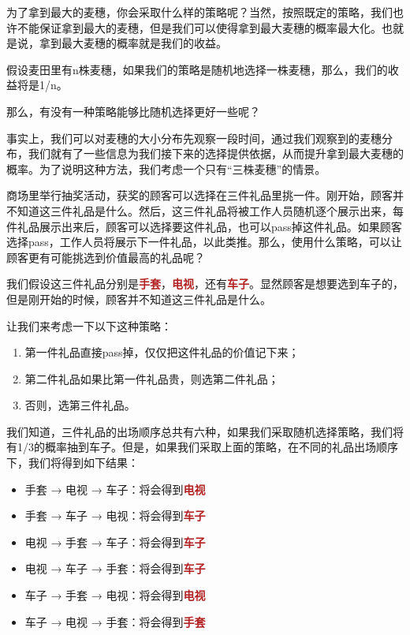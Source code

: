 \documentclass[12pt, letterpaper]{ctexrep}
\newenvironment{shadedquotation}
 {\begin{shaded*}
  \quoting[leftmargin=5pt, rightmargin=5pt, vskip=0pt]
 }
 {\endquoting
 \end{shaded*}
}
\begin{document}
为了拿到最大的麦穗，你会采取什么样的策略呢？当然，按照既定的策略，我们也许不能保证拿到最大的麦穗，但是我们可以使得拿到最大麦穗的概率最大化。也就是说，拿到最大麦穗的概率就是我们的收益。

假设麦田里有n株麦穗，如果我们的策略是随机地选择一株麦穗，那么，我们的收益将是1/n。

那么，有没有一种策略能够比随机选择更好一些呢？

事实上，我们可以对麦穗的大小分布先观察一段时间，通过我们观察到的麦穗分布，我们就有了一些信息为我们接下来的选择提供依据，从而提升拿到最大麦穗的概率。为了说明这种方法，我们考虑一个只有“三株麦穗”的情景。

\begin{shadedquotation}
\noindent
商场里举行抽奖活动，获奖的顾客可以选择在三件礼品里挑一件。刚开始，顾客并不知道这三件礼品是什么。然后，这三件礼品将被工作人员随机逐个展示出来，每件礼品展示出来后，顾客可以选择要这件礼品，也可以pass掉这件礼品。如果顾客选择pass，工作人员将展示下一件礼品，以此类推。那么，使用什么策略，可以让顾客更有可能挑选到价值最高的礼品呢？
\end{shadedquotation}


我们假设这三件礼品分别是\textbf{\textcolor{Firebrick}{手套}}，\textbf{\textcolor{Firebrick}{电视}}，还有\textbf{\textcolor{Firebrick}{车子}}。显然顾客是想要选到车子的，但是刚开始的时候，顾客并不知道这三件礼品是什么。

让我们来考虑一下以下这种策略：

\begin{enumerate}
\item{ 第一件礼品直接pass掉，仅仅把这件礼品的价值记下来； }
\item{ 第二件礼品如果比第一件礼品贵，则选第二件礼品； }
\item{ 否则，选第三件礼品。 }
\end{enumerate}


我们知道，三件礼品的出场顺序总共有六种，如果我们采取随机选择策略，我们将有1/3的概率抽到车子。但是，如果我们采取上面的策略，在不同的礼品出场顺序下，我们将得到如下结果：


\begin{itemize}
\item{ 手套 → 电视 → 车子：将会得到\textbf{\textcolor{Firebrick}{电视}} }
\item{ 手套 → 车子 → 电视：将会得到\textbf{\textcolor{Firebrick}{车子}} }
\item{ 电视 → 手套 → 车子：将会得到\textbf{\textcolor{Firebrick}{车子}} }
\item{ 电视 → 车子 → 手套：将会得到\textbf{\textcolor{Firebrick}{车子}} }
\item{ 车子 → 手套 → 电视：将会得到\textbf{\textcolor{Firebrick}{电视}} }
\item{ 车子 → 电视 → 手套：将会得到\textbf{\textcolor{Firebrick}{手套}} }
\end{itemize}
\end{document}
